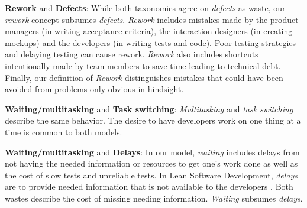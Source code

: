 


\textbf{Rework} and \textbf{Defects}: While both taxonomies agree on \textit{defects} as waste, our \textit{rework} concept subsumes \textit{defects}. \textit{Rework} includes mistakes made by the product managers (in writing acceptance criteria), the interaction designers (in creating mockups) and the developers (in writing tests and code). Poor testing strategies and delaying testing can cause rework. \textit{Rework} also includes shortcuts intentionally made by team members to save time leading to technical debt. Finally, our definition of \textit{Rework} distinguishes mistakes that could have been avoided from problems only obvious in hindsight. 

\textbf{Waiting/multitasking} and \textbf{Task switching}: \textit{Multitasking} and \textit{task switching} describe the same behavior. The desire to have developers work on one thing at a time is common to both models. 

\textbf{Waiting/multitasking} and \textbf{Delays}: In our model, \textit{waiting} includes delays from not having the needed information or resources to get one's work done as well as the cost of slow tests and unreliable tests. In Lean Software Development, \textit{delays} are  to provide needed information that is not available to the developers \cite{PoppendieckConceptToCash}. Both wastes describe the cost of missing needing information. \textit{Waiting} subsumes \textit{delays}.

